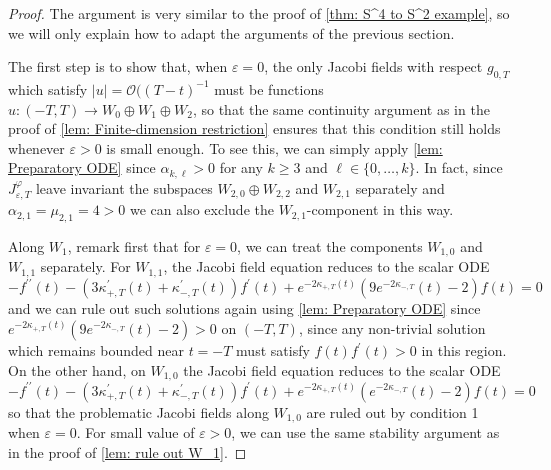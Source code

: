 \documentclass{article}
\numberwithin{equation}{section}        %
\theoremstyle{bfnote}
\theoremstyle{definition}
\theoremstyle{bfremark}
\begin{document}
\begin{proof}
    The argument is very similar to the proof of \cref{thm: S^4 to S^2 example}, so we will only explain how to adapt the arguments of the previous section.

    The first step is to show that, when $\varepsilon = 0$, the only Jacobi fields with respect $g_{0,T}$ which satisfy $|u| = \mathcal{O}((T-t)^{-1}$ must be functions $u \colon (-T,T) \to W_0 \oplus W_1 \oplus W_2$, so that the same continuity argument as in the proof of \cref{lem: Finite-dimension restriction} ensures that this condition still holds whenever $\varepsilon > 0$ is small enough. To see this, we can simply apply \cref{lem: Preparatory ODE} since $\alpha_{k,\ell} > 0$ for any $k \geq 3$ and $\ell \in \{0,\ldots,k\}$. In fact, since $J^\varphi_{\varepsilon,T}$ leave invariant the subspaces $W_{2,0} \oplus W_{2,2}$ and $W_{2,1}$ separately and $\alpha_{2,1} = \mu_{2,1} = 4 > 0$ we can also exclude the $W_{2,1}$-component in this way.

    Along $W_1$, remark first that for $\varepsilon = 0$, we can treat the components $W_{1,0}$ and $W_{1,1}$ separately. For $W_{1,1}$, the Jacobi field equation reduces to the scalar ODE
    \begin{equation*}
        - f^{\prime\prime}(t) - (3 \kappa^\prime_{+,T}(t) + \kappa^\prime_{-,T}(t)) f^\prime(t) + e^{-2\kappa_{+,T}(t)} (9e^{-2\kappa_{-,T}}(t) - 2) f(t) = 0
    \end{equation*}
    and we can rule out such solutions again using \cref{lem: Preparatory ODE} since $e^{-2\kappa_{+,T}(t)} (9e^{-2\kappa_{-,T}}(t) - 2) > 0$ on $(-T,T)$, since any non-trivial solution which remains bounded near $t = -T$ must satisfy $f(t)f^\prime(t) > 0$ in this region. On the other hand, on $W_{1,0}$ the Jacobi field equation reduces to the scalar ODE
    \begin{equation*}
        - f^{\prime\prime}(t) - (3 \kappa^\prime_{+,T}(t) + \kappa^\prime_{-,T}(t)) f^\prime(t) + e^{-2\kappa_{+,T}(t)} (e^{-2\kappa_{-,T}}(t) - 2) f(t) = 0
    \end{equation*}
    so that the problematic Jacobi fields along $W_{1,0}$ are ruled out by condition 1 when $\varepsilon = 0$. For small value of $\varepsilon > 0$, we can use the same stability argument as in the proof of \cref{lem: rule out W_1}.


\end{proof}
\end{document}
